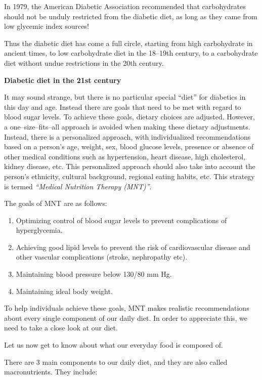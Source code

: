 In 1979, the American Diabetic Association recommended that carbohydrates should not be unduly restricted from the diabetic diet, as long as they came from low glycemic index sources!

Thus the diabetic diet has come a full circle, starting from high carbohydrate in ancient times, to low carbohydrate diet in the 18–19th century, to a carbohydrate diet without undue restrictions in the 20th century.

\noindent\textbf{Diabetic diet in the 21st century}

It may sound strange, but there is no particular special “diet” for diabetics in this day and age. Instead there are goals that need to be met with regard to blood sugar levels. To achieve these goals, dietary choices are adjusted. However, a one–size–fits–all approach is avoided when making these dietary adjustments. Instead, there is a personalized approach, with individualized recommendations based on a person’s age, weight, sex, blood glucose levels, presence or absence of other medical conditions such as hypertension, heart disease, high cholesterol, kidney disease, etc. This personalized approach should also take into account the person’s ethnicity, cultural background, regional eating habits, etc. This strategy is termed \textit{“Medical Nutrition Therapy (MNT)”}.

\noindent The goals of MNT are as follows:

\begin{enumerate}[•]
\itemsep=0pt
\item Optimizing control of blood sugar levels to prevent complications of hyperglycemia.
\item Achieving good lipid levels to prevent the risk of cardiovascular disease and other vascular complications (stroke, nephropathy etc).
\item Maintaining blood pressure below 130/80 mm Hg.
\item Maintaining ideal body weight.
\end{enumerate}

To help individuals achieve these goals, MNT makes realistic recommendations about every single component of our daily diet. In order to appreciate this, we need to take a close look at our diet.

Let us now get to know about what our everyday food is composed of.

There are 3 main components to our daily diet, and they are also called macronutrients. They include:

